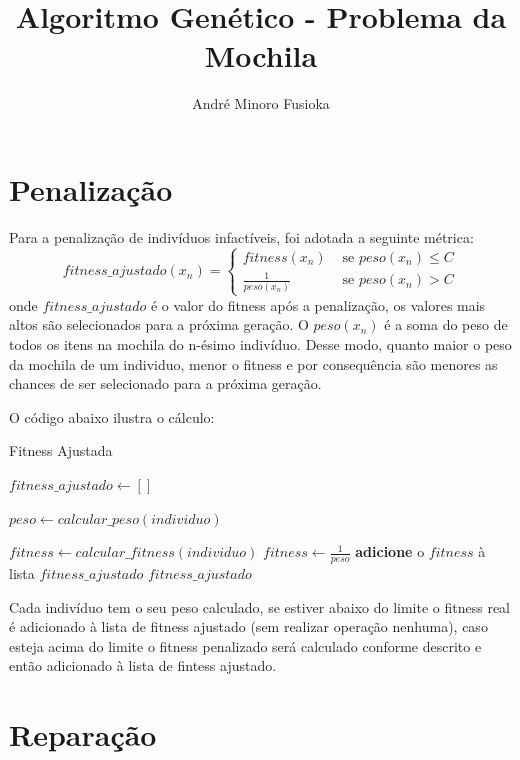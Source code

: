 \documentclass[11pt]{article}
\title{\textbf{Algoritmo Genético - Problema da Mochila}}
\author{André Minoro Fusioka}
\date{}
\begin{document}
\maketitle

\section{Penalização}

Para a penalização de indivíduos infactíveis,  foi adotada a seguinte métrica: 
$$
fitness\_ajustado(x_n) =
\begin{cases}
 fitness(x_n) & \text{ se } peso(x_n) \leq  C \\ 
 \frac{1}{peso(x_n)} & \text{ se } peso(x_n) >  C 
\end{cases}
$$
onde $fitness\_ajustado$ é o valor do fitness após a penalização, os valores mais altos são selecionados para a próxima geração. O $peso(x_n)$ é a soma do peso de todos os itens na mochila do n-ésimo indivíduo. Desse modo, quanto maior o peso da mochila de um individuo, menor o fitness e por consequência são menores as chances de ser selecionado  para a próxima geração.

O código abaixo ilustra o cálculo:

\begin{algorithm}
	\caption{Fitness Ajustada}\label{euclid}
	\begin{algorithmic}[1]
		
			\State $fitness\_ajustado \gets []$
			
				 \State $peso \gets calcular\_peso(individuo)$
				
					\State $fitness \gets calcular\_fitness(individuo) $
				 \Else
					\State $fitness \gets \frac{1}{peso}$		 
				\EndIf
				\State \textbf{adicione} o $fitness$ à lista $fitness\_ajustado$
			\State \Return $fitness\_ajustado$
		\EndFunction
	\end{algorithmic}
\end{algorithm}

Cada indivíduo tem o seu peso calculado, se estiver abaixo do limite o fitness real é adicionado à lista de fitness ajustado (sem realizar operação nenhuma), caso esteja acima do limite o fitness penalizado será calculado conforme descrito e então adicionado à lista de fintess ajustado. 

\section{Reparação}
\end{document}
